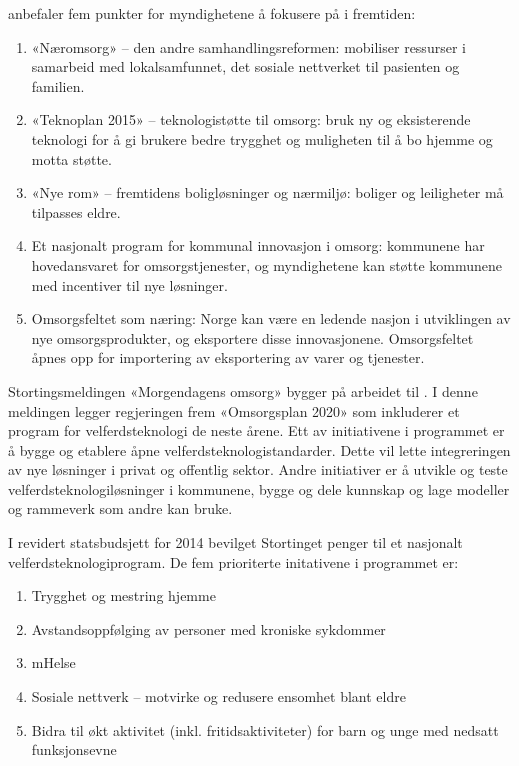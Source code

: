 \citet{regjeringen_hagen} anbefaler fem punkter for myndighetene å fokusere på i fremtiden:

\begin{enumerate}
    \item «Næromsorg» -- den andre samhandlingsreformen: mobiliser ressurser i samarbeid med
    lokalsamfunnet, det sosiale nettverket til pasienten og familien.
    \item «Teknoplan 2015» -- teknologistøtte til omsorg: bruk ny og eksisterende teknologi for å gi brukere
    bedre trygghet og muligheten til å bo hjemme og motta støtte.
    \item «Nye rom» -- fremtidens boligløsninger og nærmiljø: boliger og leiligheter må tilpasses eldre.
    \item Et nasjonalt program for kommunal innovasjon i omsorg: kommunene har hovedansvaret for omsorgstjenester,
    og myndighetene kan støtte kommunene med incentiver til nye løsninger.
    \item Omsorgsfeltet som næring: Norge kan være en ledende nasjon i utviklingen av nye omsorgsprodukter, og
    eksportere disse innovasjonene. Omsorgsfeltet åpnes opp for importering av eksportering av varer og tjenester.
\end{enumerate}


Stortingsmeldingen «Morgendagens omsorg» bygger på arbeidet til \citet{regjeringen_hagen} \citep{morgendagens_omsorg}.
I denne meldingen legger regjeringen frem «Omsorgsplan 2020» som inkluderer et program for velferdsteknologi de neste årene.
Ett av initiativene i programmet er å bygge og etablere åpne velferdsteknologistandarder. Dette vil lette integreringen av nye
løsninger i privat og offentlig sektor. Andre initiativer er å utvikle og teste velferdsteknologiløsninger i kommunene,
bygge og dele kunnskap og lage modeller og rammeverk som andre kan bruke.

I revidert statsbudsjett for 2014 bevilget Stortinget penger til et nasjonalt velferdsteknologiprogram. De fem prioriterte
initativene i programmet er:

\begin{enumerate}
    \item Trygghet og mestring hjemme
    \item Avstandsoppfølging av personer med kroniske sykdommer
    \item mHelse
    \item Sosiale nettverk -- motvirke og redusere ensomhet blant eldre
    \item Bidra til økt aktivitet (inkl. fritidsaktiviteter) for barn og unge med nedsatt funksjonsevne
\end{enumerate}

